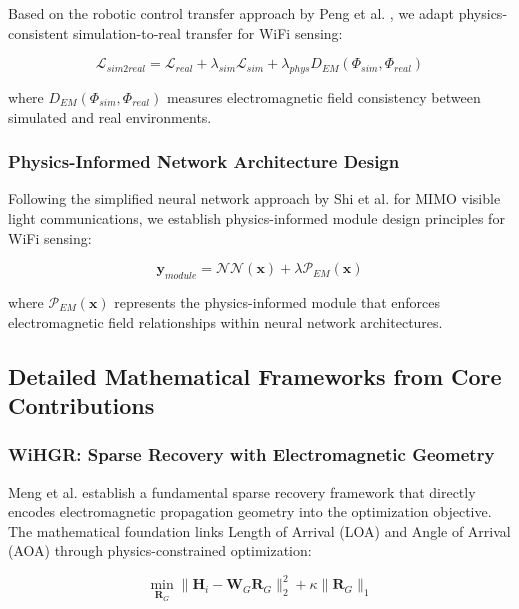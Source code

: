 \documentclass[journal]{IEEEtran}
\begin{document}
Based on the robotic control transfer approach by Peng et al. \cite{peng2018sim}, we adapt physics-consistent simulation-to-real transfer for WiFi sensing:

\begin{equation}
\mathcal{L}_{sim2real} = \mathcal{L}_{real} + \lambda_{sim} \mathcal{L}_{sim} + \lambda_{phys} D_{EM}(\Phi_{sim}, \Phi_{real})
\label{eq:sim2real_physics}
\end{equation}

where $D_{EM}(\Phi_{sim}, \Phi_{real})$ measures electromagnetic field consistency between simulated and real environments.

\subsubsection{Physics-Informed Network Architecture Design}

Following the simplified neural network approach by Shi et al. \cite{shi2023simplified} for MIMO visible light communications, we establish physics-informed module design principles for WiFi sensing:

\begin{equation}
\mathbf{y}_{module} = \mathcal{NN}(\mathbf{x}) + \lambda \mathcal{P}_{EM}(\mathbf{x})
\label{eq:physics_module}
\end{equation}

where $\mathcal{P}_{EM}(\mathbf{x})$ represents the physics-informed module that enforces electromagnetic field relationships within neural network architectures.

\subsection{Detailed Mathematical Frameworks from Core Contributions}

\subsubsection{WiHGR: Sparse Recovery with Electromagnetic Geometry}

Meng et al. \cite{meng2021wihgr} establish a fundamental sparse recovery framework that directly encodes electromagnetic propagation geometry into the optimization objective. The mathematical foundation links Length of Arrival (LOA) and Angle of Arrival (AOA) through physics-constrained optimization:

\begin{equation}
\min_{\mathbf{R}_G} \|\mathbf{H}_i - \mathbf{W}_G \mathbf{R}_G\|_2^2 + \kappa \|\mathbf{R}_G\|_1
\label{eq:wihgr_sparse}
\end{equation}
\end{document}
